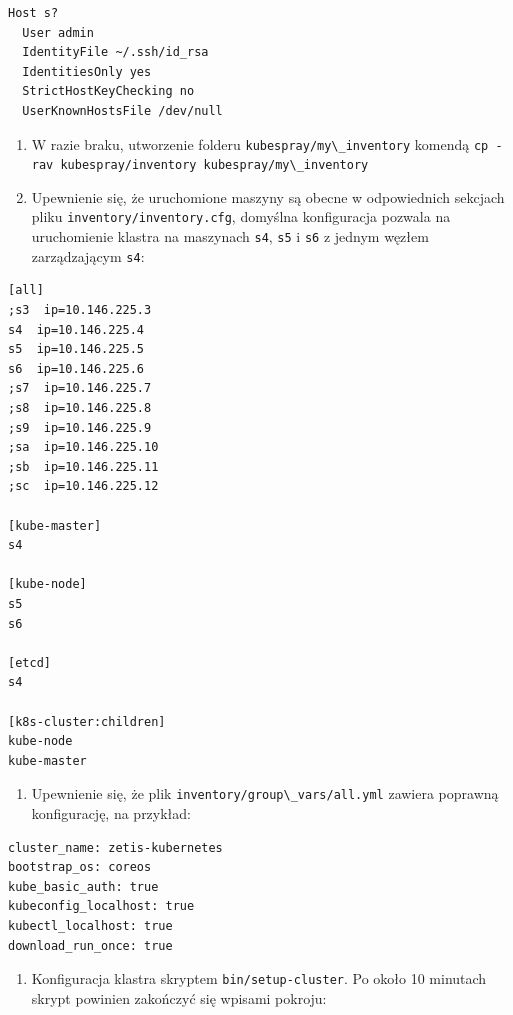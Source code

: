 \documentclass[a4paper,12pt,twoside,openany]{report}
\providecommand{\tightlist}{%
  \setlength{\itemsep}{0pt}\setlength{\parskip}{0pt}}
\newcommand{\passthrough}[1]{#1}
\begin{document}
\begin{lstlisting}
Host s?
  User admin
  IdentityFile ~/.ssh/id_rsa
  IdentitiesOnly yes
  StrictHostKeyChecking no
  UserKnownHostsFile /dev/null
\end{lstlisting}

\begin{enumerate}
\def\labelenumi{\arabic{enumi}.}
\setcounter{enumi}{4}
\item
  W razie braku, utworzenie folderu
  \passthrough{\lstinline!kubespray/my\_inventory!} komendą
  \passthrough{\lstinline!cp -rav kubespray/inventory kubespray/my\_inventory!}
\item
  Upewnienie się, że uruchomione maszyny są obecne w odpowiednich
  sekcjach pliku \passthrough{\lstinline!inventory/inventory.cfg!},
  domyślna konfiguracja pozwala na uruchomienie klastra na maszynach
  \passthrough{\lstinline!s4!}, \passthrough{\lstinline!s5!} i
  \passthrough{\lstinline!s6!} z jednym węzłem zarządzającym
  \passthrough{\lstinline!s4!}:
\end{enumerate}

\begin{lstlisting}
[all]
;s3  ip=10.146.225.3
s4  ip=10.146.225.4
s5  ip=10.146.225.5
s6  ip=10.146.225.6
;s7  ip=10.146.225.7
;s8  ip=10.146.225.8
;s9  ip=10.146.225.9
;sa  ip=10.146.225.10
;sb  ip=10.146.225.11
;sc  ip=10.146.225.12

[kube-master]
s4

[kube-node]
s5
s6

[etcd]
s4

[k8s-cluster:children]
kube-node
kube-master
\end{lstlisting}

\begin{enumerate}
\def\labelenumi{\arabic{enumi}.}
\setcounter{enumi}{6}
\tightlist
\item
  Upewnienie się, że plik
  \passthrough{\lstinline!inventory/group\_vars/all.yml!} zawiera
  poprawną konfigurację, na przykład:
\end{enumerate}

\begin{lstlisting}
cluster_name: zetis-kubernetes
bootstrap_os: coreos
kube_basic_auth: true
kubeconfig_localhost: true
kubectl_localhost: true
download_run_once: true
\end{lstlisting}

\begin{enumerate}
\def\labelenumi{\arabic{enumi}.}
\setcounter{enumi}{7}
\tightlist
\item
  Konfiguracja klastra skryptem
  \passthrough{\lstinline!bin/setup-cluster!}. Po około 10 minutach
  skrypt powinien zakończyć się wpisami pokroju:
\end{enumerate}
\end{document}
